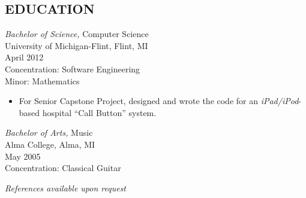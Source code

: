 \documentclass[line,margin]{res}
\begin{document}
\begin{resume}
\section{EDUCATION} 
                {\sl Bachelor of Science,} Computer Science \\
                University of Michigan-Flint, Flint, MI \\
                April 2012 \\
                Concentration: Software Engineering \\
                Minor: Mathematics
                \begin{itemize}
                    \item For Senior Capstone Project, designed and wrote 
                            the code for an {\sl iPad/iPod}-based hospital
                            ``Call Button'' system.
                \end{itemize}

                {\sl Bachelor of Arts,} Music \\
                Alma College, Alma, MI \\
                May 2005 \\
                Concentration: Classical Guitar

\end{resume}

\begin{flushleft}
{\sl References available upon request} \\
\end{flushleft}

\pagestyle{fancy}
\end{document}
